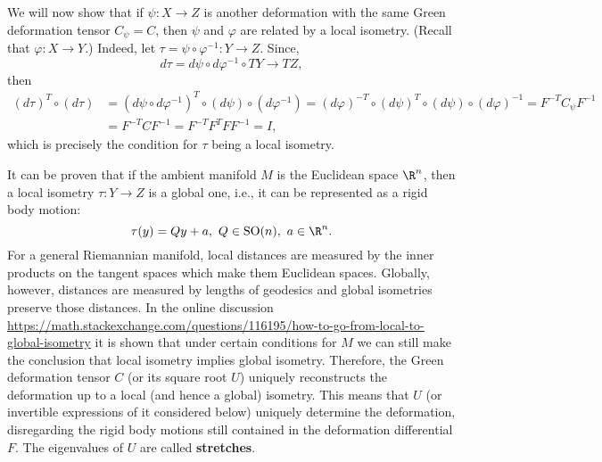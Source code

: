 \begin{discussion}
  We will now show that if $\psi \colon X \to Z$ is another deformation with
  the same Green deformation tensor $C_\psi = C$, then $\psi$ and $\varphi$ are
  related by a local isometry.
  (Recall that $\varphi \colon X \to Y$.)
  Indeed, let $\tau = \psi \circ \varphi^{-1} \colon Y \to Z$.
  Since,
  \begin{equation}
    d \tau = d \psi \circ d \varphi^{-1} \circ T Y \to T Z,
  \end{equation}
  then
  \begin{equation}
    \begin{split}
        (d \tau)^T \circ (d \tau)
      & = (d \psi \circ d \varphi^{-1})^T \circ (d \psi) \circ (d \varphi^{-1})
        = (d \varphi)^{-T} \circ (d \psi)^T \circ (d \psi) \circ
          (d \varphi)^{-1}
        = F^{-T} C_\psi F^{-1} \\
      & = F^{-T} C F^{-1}
        = F^{-T} F^T F F^{-1}
        = I,
    \end{split}
  \end{equation}
  which is precisely the condition for $\tau$ being a local isometry.
\end{discussion}
\begin{discussion}
  It can be proven that if the ambient manifold $M$ is the Euclidean space
  $\R^n$, then a local isometry $\tau \colon Y \to Z$ is a global one,
  i.e., it can be represented as a rigid body motion:
  \begin{equation}
    \tau(y) = Q y + a,\ Q \in {\rm SO}(n),\ a \in \R^n.
  \end{equation}
  For a general Riemannian manifold, local distances are measured by the inner
  products on the tangent spaces which make them Euclidean spaces.
  Globally, however, distances are measured by lengths of geodesics and global
  isometries preserve those distances.
  In the online discussion
  \url{https://math.stackexchange.com/questions/116195/how-to-go-from-local-to-global-isometry}
  it is shown that under certain conditions for $M$ we can still make the
  conclusion that local isometry implies global isometry.
  Therefore, the Green deformation tensor $C$ (or its square root $U$) uniquely
  reconstructs the deformation up to a local (and hence a global) isometry.
  This means that $U$ (or invertible expressions of it considered below)
  uniquely determine the deformation, disregarding the rigid body motions still
  contained in the deformation differential $F$.
  The eigenvalues of $U$ are called \textbf{stretches}.
\end{discussion}
